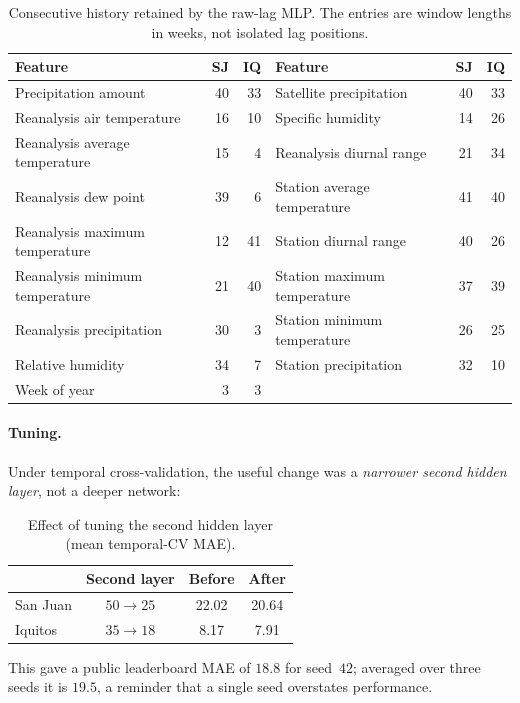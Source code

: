 \documentclass[11pt,a4paper]{article}
\begin{document}
\begin{table}[H]
\centering
\caption{Consecutive history retained by the raw-lag MLP. The entries are window lengths in weeks, not isolated lag positions.}
\label{tab:lagwindows}
\scriptsize
\begin{tabular}{lrr@{\hspace{0.7cm}}lrr}
\toprule
\textbf{Feature} & \textbf{SJ} & \textbf{IQ} & \textbf{Feature} & \textbf{SJ} & \textbf{IQ}\\
\midrule
Precipitation amount & 40 & 33 & Satellite precipitation & 40 & 33\\
Reanalysis air temperature & 16 & 10 & Specific humidity & 14 & 26\\
Reanalysis average temperature & 15 & 4 & Reanalysis diurnal range & 21 & 34\\
Reanalysis dew point & 39 & 6 & Station average temperature & 41 & 40\\
Reanalysis maximum temperature & 12 & 41 & Station diurnal range & 40 & 26\\
Reanalysis minimum temperature & 21 & 40 & Station maximum temperature & 37 & 39\\
Reanalysis precipitation & 30 & 3 & Station minimum temperature & 26 & 25\\
Relative humidity & 34 & 7 & Station precipitation & 32 & 10\\
Week of year & 3 & 3 & & & \\
\bottomrule
\end{tabular}
\end{table}

\paragraph{Tuning.} Under temporal cross-validation, the useful change was a \emph{narrower second hidden layer}, not a deeper network:
\begin{table}[H]
\centering
\caption{Effect of tuning the second hidden layer (mean temporal-CV MAE).}
\begin{tabular}{lccc}
\toprule
 & \textbf{Second layer} & \textbf{Before} & \textbf{After}\\
\midrule
San Juan & $50\rightarrow25$ & 22.02 & 20.64\\
Iquitos & $35\rightarrow18$ & 8.17 & 7.91\\
\bottomrule
\end{tabular}
\end{table}
This gave a public leaderboard MAE of $18.8$ for seed~$42$; averaged over three seeds it is $19.5$, a reminder that a single seed overstates performance.
\end{document}
